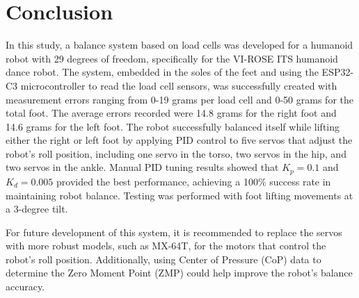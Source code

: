 \section{Conclusion}
\label{sec:conclusion}

In this study, a balance system based on load cells was developed for a humanoid robot with 29 degrees of freedom, specifically for the VI-ROSE ITS humanoid dance robot. The system, embedded in the soles of the feet and using the ESP32-C3 microcontroller to read the load cell sensors, was successfully created with measurement errors ranging from 0-19 grams per load cell and 0-50 grams for the total foot. The average errors recorded were 14.8 grams for the right foot and 14.6 grams for the left foot. The robot successfully balanced itself while lifting either the right or left foot by applying PID control to five servos that adjust the robot's roll position, including one servo in the torso, two servos in the hip, and two servos in the ankle. Manual PID tuning results showed that $K_p = 0.1$ and $K_d = 0.005$ provided the best performance, achieving a 100\% success rate in maintaining robot balance. Testing was performed with foot lifting movements at a 3-degree tilt.

For future development of this system, it is recommended to replace the servos with more robust models, such as MX-64T, for the motors that control the robot's roll position. Additionally, using Center of Pressure (CoP) data to determine the Zero Moment Point (ZMP) could help improve the robot's balance accuracy.